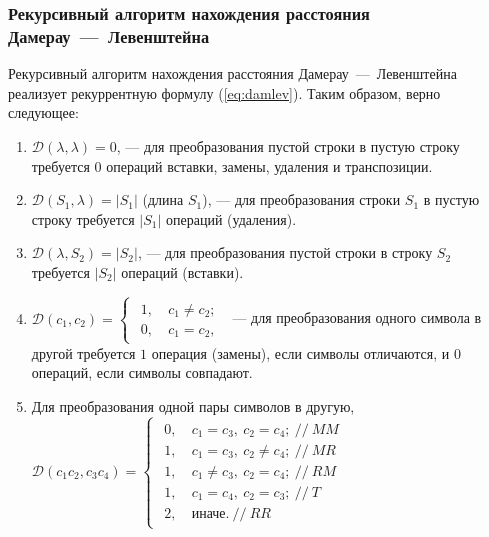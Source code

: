 \subsubsection{Рекурсивный алгоритм нахождения расстояния Дамерау~---~Левенштейна}

Рекурсивный алгоритм нахождения расстояния Дамерау~---~Левенштейна реализует рекуррентную формулу (\ref{eq:damlev}). Таким образом, верно следующее:
\begin{enumerate}
    \item $\mathcal{D}(\lambda, \lambda) = 0$, --- для преобразования пустой строки в пустую строку требуется $0$ операций вставки, замены, удаления и транспозиции.
    \item $\mathcal{D}(S_1, \lambda) = |S_1|$ (длина $S_1$), --- для преобразования строки $S_1$ в пустую строку требуется $|S_1|$ операций (удаления).
    \item $\mathcal{D}(\lambda, S_2) = |S_2|$, --- для преобразования пустой строки в строку $S_2$ требуется $|S_2|$ операций (вставки).
    \item $\mathcal{D}(c_1, c_2) = \begin{cases}
            \begin{aligned}
                1,\ &c_1 \neq c_2; \\
                0,\ &c_1 = c_2,
            \end{aligned}
    \end{cases} $ --- для преобразования одного символа в другой требуется $1$ операция (замены), если символы отличаются, и $0$ операций, если символы совпадают.
    \item Для преобразования одной пары символов в другую, \\
        $\mathcal{D}(c_1c_2, c_3c_4) = \begin{cases}
            \begin{aligned}
                0,\ &c_1 = c_3,\ c_2 = c_4;\ //\ MM \\
                1,\ &c_1 = c_3,\ c_2 \neq c_4;\ //\ MR \\
                1,\ &c_1 \neq c_3,\ c_2 = c_4;\ //\ RM \\
                1,\ &c_1 = c_4,\ c_2 = c_3;\ //\ T \\
                2,\ &\text{иначе}.\ //\ RR
            \end{aligned}
        \end{cases} $

\end{enumerate}
